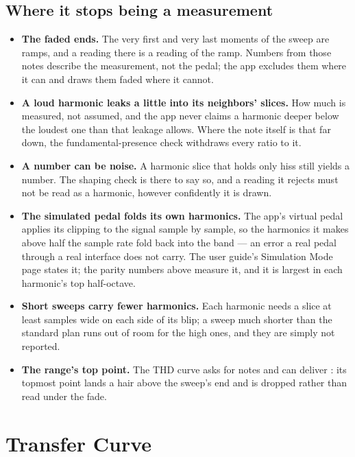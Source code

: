 \documentclass[11pt,a4paper]{article}
\begin{document}
\subsection{Where it stops being a measurement}

\begin{itemize}
  \item \textbf{The faded ends.} The very first and very last moments of
  the sweep are ramps, and a reading there is a reading of the ramp.
  Numbers from those notes describe the measurement, not the pedal; the
  app excludes them where it can and draws them faded where it cannot.
  \item \textbf{A loud harmonic leaks a little into its neighbors'
  slices.} How much is measured, not assumed, and the app never claims a
  harmonic deeper below the loudest one than that leakage allows. Where
  the note itself is that far down, the fundamental-presence check
  withdraws every ratio to it.
  \item \textbf{A number can be noise.} A harmonic slice that holds only
  hiss still yields a number. The shaping check is there to say so, and a
  reading it rejects must not be read as a harmonic, however confidently
  it is drawn.
  \item \textbf{The simulated pedal folds its own harmonics.} The app's
  virtual pedal applies its clipping to the signal sample by sample, so
  the harmonics it makes above half the sample rate fold back into the
  band --- an error a real pedal through a real interface does not carry.
  The user guide's Simulation Mode page states it; the parity numbers
  above measure it, and it is largest in each harmonic's top
  half-octave.
  \item \textbf{Short sweeps carry fewer harmonics.} Each harmonic needs
  a slice at least \hdMinimumHalfWidthSamples{} samples wide on each side
  of its blip; a sweep much shorter than the standard plan runs out of
  room for the high ones, and they are simply not reported.
  \item \textbf{The range's top point.} The THD curve asks for
  \hdThdGridRequested{} notes and can deliver \hdThdGridPoints{}: its
  topmost point lands a hair above the sweep's end and is dropped rather
  than read under the fade.
\end{itemize}

\clearpage

\section{Transfer Curve}
\label{sec:transfer-plain}
\end{document}
